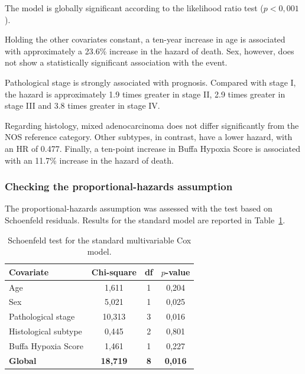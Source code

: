\documentclass[12pt,a4paper]{article}
\begin{document}
The model is globally significant according to the likelihood ratio test ($p<0,001$).

Holding the other covariates constant, a ten-year increase in age is associated with approximately a 23.6\% increase in the hazard of death. Sex, however, does not show a statistically significant association with the event.

Pathological stage is strongly associated with prognosis. Compared with stage I, the hazard is approximately 1.9 times greater in stage II, 2.9 times greater in stage III and 3.8 times greater in stage IV.

Regarding histology, mixed adenocarcinoma does not differ significantly from the NOS reference category. Other subtypes, in contrast, have a lower hazard, with an HR of 0.477. Finally, a ten-point increase in Buffa Hypoxia Score is associated with an 11.7\% increase in the hazard of death.

\subsubsection{Checking the proportional-hazards assumption}

The proportional-hazards assumption was assessed with the test based on Schoenfeld residuals. Results for the standard model are reported in Table~\ref{tab:schoenfeld_standard}.

\begin{table}[H]
\centering
\caption{Schoenfeld test for the standard multivariable Cox model.}
\label{tab:schoenfeld_standard}
\renewcommand{\arraystretch}{1.15}
\begin{tabular}{l c c c}
\toprule
\textbf{Covariate}
& \textbf{Chi-square}
& \textbf{df}
& \textbf{$p$-value} \\
\midrule
Age
& 1,611
& 1
& 0,204 \\

Sex
& 5,021
& 1
& 0,025 \\

Pathological stage
& 10,313
& 3
& 0,016 \\

Histological subtype
& 0,445
& 2
& 0,801 \\

Buffa Hypoxia Score
& 1,461
& 1
& 0,227 \\

\textbf{Global}
& \textbf{18,719}
& \textbf{8}
& \textbf{0,016} \\
\bottomrule
\end{tabular}
\end{table}
\end{document}
